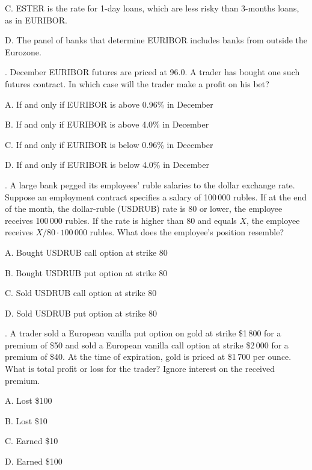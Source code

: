 \documentclass[a4paper,14pt]{extarticle}
\begin{document}
C. ESTER is the rate for 1-day loans, which are less risky than 3-months loans, as in EURIBOR.

D. The panel of banks that determine EURIBOR includes banks from outside the Eurozone.

\vspace{\baselineskip}

. December EURIBOR futures are priced at 96.0. A trader has bought one such futures contract. In which case will the trader make a profit on his bet?

A. If and only if EURIBOR is above 0.96\% in December 

B. If and only if EURIBOR is above 4.0\% in December 

C. If and only if EURIBOR is below 0.96\% in December 

D. If and only if EURIBOR is below 4.0\% in December 

\vspace{\baselineskip}

. A large bank pegged its employees' ruble salaries to the dollar exchange rate. Suppose an employment contract specifies a salary of 100\,000 rubles. If at the end of the month, the dollar-ruble (USDRUB) rate is 80 or lower, the employee receives 100\,000 rubles. If the rate is higher than 80 and equals $X$, the employee receives $X/80 \cdot 100\,000$ rubles. What does the employee's position resemble?

A. Bought USDRUB call option at strike 80

B. Bought USDRUB put option at strike 80

C. Sold USDRUB call option at strike 80

D. Sold USDRUB put option at strike 80

\vspace{\baselineskip}

. A trader sold a European vanilla put option on gold at strike \$1\,800 for a premium of \$50 and sold a European vanilla call option at strike \$2\,000 for a premium of \$40. At the time of expiration, gold is priced at \$1\,700 per ounce. What is total profit or loss for the trader? Ignore interest on the received premium.

A. Lost \$100

B. Lost \$10

C. Earned \$10

D. Earned \$100

\vspace{\baselineskip}
\end{document}

